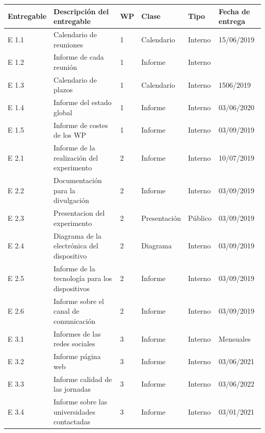 \documentclass[11pt]{extarticle}
\begin{document}
				\begin{table}[H]
				    \centering
					\begin{tabular}{p{2.4cm} p{4.5cm} p{0.7cm} p{1.0cm} p{1.0cm} p{2.0cm}}
						\hline
						\multicolumn{1}{m{2.4cm}}{\centering \textbf{Entregable}} &  
						\multicolumn{1}{m{4.5cm}}{\centering \textbf{Descripción del entregable}} &           \multicolumn{1}{m{0.7cm}}{\centering \textbf{WP}} & 
				        \multicolumn{1}{m{2.0cm}}{\textbf{Clase}}  &
					    \multicolumn{1}{m{1.8cm}}{\textbf{Tipo}} &     	         \multicolumn{1}{m{2.0cm}}{\centering \textbf{Fecha de entrega}} \\ \hline
					    \hline
					    E 1.1 & Calendario de reuniones & 1 & Calendario & Interno & 15/06/2019 \\ \hline
					    E 1.2 & Informe de cada reunión & 1 & Informe & Interno &  \\ \hline
					    E 1.3 & Calendario de plazos & 1 & Calendario & Interno & 1506/2019 \\ \hline
					    E 1.4 & Informe del estado global & 1 & Informe & Interno & 03/06/2020 \\ \hline
					    E 1.5 & Informe de costes de los WP & 1 & Informe & Interno & 03/09/2019 \\ \hline
					    E 2.1 & Informe de la realización del experimento & 2 & Informe & Interno & 10/07/2019 \\ \hline
					    E 2.2 & Documentación para la divulgación & 2 & Informe & Interno & 03/09/2019 \\ \hline
					    E 2.3 & Presentacion del experimento & 2 & Presentación & Público & 03/09/2019 \\ \hline
					    E 2.4 & Diagrama de la electrónica del dispositivo & 2 & Diagrama & Interno & 03/09/2019 \\ \hline
					    E 2.5 & Informe de la tecnología para los dispositivos & 2 & Informe & Interno & 03/09/2019 \\ \hline
					    E 2.6 & Informe sobre el canal de comunicación & 2 & Informe & Interno & 03/09/2019 \\ \hline
					    E 3.1 & Informes de las redes sociales & 3 & Informe & Interno & Mensuales \\ \hline
					    E 3.2 & Informe página web & 3 & Informe & Interno & 03/06/2021 \\ \hline
					    E 3.3 & Informe calidad de las jornadas & 3 & Informe & Interno & 03/06/2022 \\ \hline
					    E 3.4 & Informe sobre las universidades contactadas & 3 & Informe & Interno & 03/01/2021 \\ \hline

\end{tabular}
\end{table}
\end{document}
